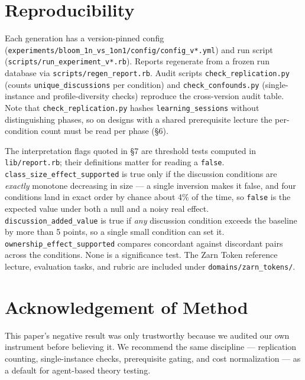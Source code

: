 \documentclass[11pt]{article}
\begin{document}
\section{Reproducibility}
\label{appendix:reproducibility}

Each generation has a version-pinned config
(\texttt{experiments/bloom\_1n\_vs\_1on1/config/config\_v*.yml}) and run script
(\texttt{scripts/run\_experiment\_v*.rb}).  Reports regenerate from a frozen run
database via \texttt{scripts/regen\_report.rb}.  Audit scripts
\texttt{check\_replication.py} (counts \texttt{unique\_discussions} per condition)
and \texttt{check\_confounds.py} (single-instance and profile-diversity checks)
reproduce the cross-version audit table. Note that
\texttt{check\_replication.py} hashes \texttt{learning\_sessions} without
distinguishing phases, so on designs with a shared prerequisite lecture the
per-condition count must be read per phase (\S6).

The interpretation flags quoted in \S7 are threshold tests computed in
\texttt{lib/report.rb}; their definitions matter for reading a \texttt{false}.
\texttt{class\_size\_effect\_supported} is true only if the discussion conditions are
\emph{exactly} monotone decreasing in size --- a single inversion makes it false, and
four conditions land in exact order by chance about 4\% of the time, so
\texttt{false} is the expected value under both a null and a noisy real effect.
\texttt{discussion\_added\_value} is true if \emph{any} discussion condition exceeds
the baseline by more than 5 points, so a single small condition can set it.
\texttt{ownership\_effect\_supported} compares concordant against discordant pairs
across the conditions.  None is a significance test.  The Zarn Token reference lecture,
evaluation tasks, and rubric are included under \texttt{domains/zarn\_tokens/}.

\section*{Acknowledgement of Method}

This paper's negative result was only trustworthy because we audited our own
instrument before believing it.  We recommend the same discipline --- replication
counting, single-instance checks, prerequisite gating, and cost normalization --- as
a default for agent-based theory testing.
\end{document}
